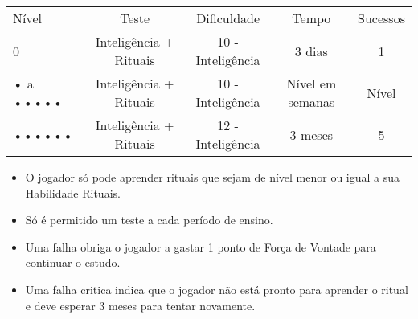 \begin{table}[!htpb]
\centering
\label{Rituais_tempo}
\begin{tabular}{|l c c c c|}
\hline
Nível		&	Teste					& Dificuldade		& Tempo		& Sucessos		\\
\rowcolor[HTML]{EFEFEF} 
0			& 	Inteligência + Rituais	& 10 - Inteligência & 3 dias	& 1\\
• a •••••	& 	Inteligência + Rituais	& 10 - Inteligência & Nível em semanas	& Nível\\
\rowcolor[HTML]{EFEFEF} 
••••••		& 	Inteligência + Rituais	& 12 - Inteligência & 3 meses	& 5\\

\hline
\end{tabular}
\end{table}

\begin{itemize}[noitemsep]
\item O jogador só pode aprender rituais que sejam de nível menor ou igual a sua Habilidade Rituais.
\item Só é permitido um teste a cada período de ensino.
\item Uma falha obriga o jogador a gastar 1 ponto de Força de Vontade para continuar o estudo.
\item Uma falha critica indica que o jogador não está pronto para aprender o ritual e deve esperar 3 meses para tentar novamente.
\end{itemize}
